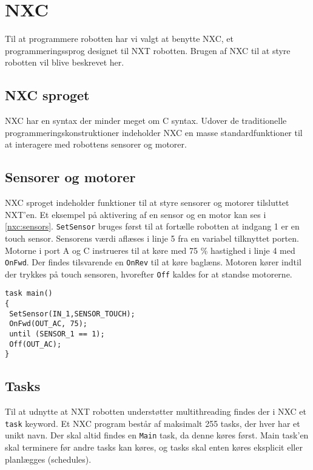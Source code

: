 \section{NXC}\label{nxc}
Til at programmere robotten har vi valgt at benytte NXC, et programmeringssprog designet til NXT robotten. 
Brugen af NXC til at styre robotten vil blive beskrevet her. \cite{NXC}

\subsection{NXC sproget}
NXC har en syntax der minder meget om C syntax. 
Udover de traditionelle programmeringskonstruktioner indeholder NXC en masse standardfunktioner til at interagere med robottens sensorer og motorer.

\subsection{Sensorer og motorer}
NXC sproget indeholder funktioner til at styre sensorer og motorer tilsluttet NXT'en.
Et eksempel på aktivering af en sensor og en motor kan ses i \cref{nxc:sensors}.
\lstinline[style=c]!SetSensor! bruges først til at fortælle robotten at indgang 1 er en touch sensor. 
Sensorens værdi aflæses i linje 5 fra en variabel tilknyttet porten.
Motorne i port A og C instrueres til at køre med 75 \% hastighed i linje 4 med \lstinline[style=c]!OnFwd!.  
Der findes tilsvarende en \lstinline[style=c]!OnRev! til at køre baglæns.
Motoren kører indtil der trykkes på touch sensoren, hvorefter \lstinline[style=c]!Off! kaldes for at standse motorerne.

\begin{lstlisting}[style=c,label=nxc:sensors, caption={Brug af motorer og sensorer}]
task main()
{
 SetSensor(IN_1,SENSOR_TOUCH);
 OnFwd(OUT_AC, 75);
 until (SENSOR_1 == 1);
 Off(OUT_AC);
}
\end{lstlisting}

\subsection{Tasks}
Til at udnytte at NXT robotten understøtter multithreading findes der i NXC et \lstinline[style=c]!task! keyword.
Et NXC program består af maksimalt 255 tasks, der hver har et unikt navn. 
Der skal altid findes en \lstinline[style=c]!Main! task, da denne køres først.
Main task'en skal terminere før andre tasks kan køres, og tasks skal enten køres eksplicit eller planlægges (schedules).

